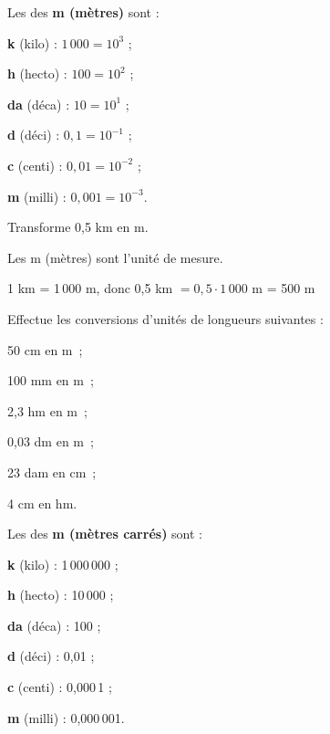 
\vspace{2em}


\begin{aconnaitre}
Les  des \textbf{\textcolor{H1}{m (mètres)}} sont :
\begin{colitemize}{2}
\item \textbf{k} (kilo) : $1\,000 = 10^3$ ;
\item \textbf{h} (hecto) : $100 = 10^2$ ;
\item \textbf{da} (déca) : $10 = 10^1$ ;
\item \textbf{d} (déci) : $0,1 = 10^{-1}$ ;
\item \textbf{c} (centi) : $0,01 = 10^{-2}$ ;
\item \textbf{m} (milli) : $0,001 = 10^{-3}$.
\end{colitemize}
\end{aconnaitre}

\vspace{2em}

\begin{methode*1}

\begin{exemple*1}
Transforme 0,5 km en m.

Les m (mètres) sont l'unité de mesure.

1 km = 1\,000 m, donc 0,5 km $= 0,5 \cdot 1\,000$ m = 500 m
\end{exemple*1}

\exercice 
Effectue les conversions d'unités de longueurs suivantes :
\begin{colenumerate}{3}
 \item 50 cm en m ;
 \item 100 mm en m ;
 \item 2,3 hm en m ;
 \item 0,03 dm en m ;
 \item 23 dam en cm ;
 \item 4 cm en hm.
 \end{colenumerate}

\end{methode*1}

\newpage

\begin{aconnaitre}
Les  des \textbf{\textcolor{H1}{m (mètres carrés)}} sont :
\begin{colitemize}{2}
\item \textbf{k} (kilo) : 1\,000\,000 ;
\item \textbf{h} (hecto) : 10\,000 ;
\item \textbf{da} (déca) : 100 ;
\item \textbf{d} (déci) : 0,01 ;
\item \textbf{c} (centi) : 0,000\,1 ;
\item \textbf{m} (milli) : 0,000\,001.
\end{colitemize}
\end{aconnaitre}

